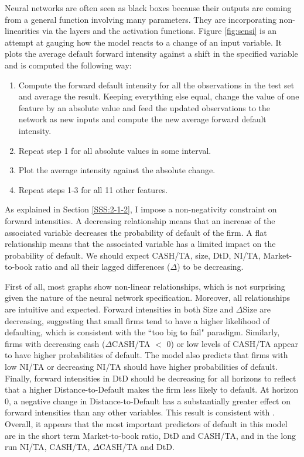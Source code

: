 Neural networks are often seen as black boxes because their outputs are coming from a general function involving many parameters. They are incorporating non-linearities via the layers and the activation functions. Figure \ref{fig:sensi} is an attempt at gauging how the model reacts to a change of an input variable. It plots the average default forward intensity against a shift in the specified variable and is computed the following way:

\begin{enumerate}
    \item Compute the forward default intensity for all the observations in the test set and average the result. Keeping everything else equal, change the value of one feature by an absolute value and feed the updated observations to the network as new inputs and compute the new average forward default intensity. 
    \item Repeat step 1 for all absolute values in some interval.
    \item Plot the average intensity against the absolute change.
    \item Repeat steps 1-3 for all 11 other features.
\end{enumerate}

As explained in Section \ref{SSS:2-1-2}, I impose a non-negativity constraint on forward intensities. A decreasing relationship means that an increase of the associated variable decreases the probability of default of the firm. A flat relationship means that the associated variable has a limited impact on the probability of default. We should expect CASH/TA, size, DtD, NI/TA, Market-to-book ratio and all their lagged differences ($\Delta$) to be decreasing.

First of all, most graphs show non-linear relationships, which is not surprising given the nature of the neural network specification. Moreover, all relationships are intuitive and expected. Forward intensities in both Size and $\Delta$Size are decreasing, suggesting that small firms tend to have a higher likelihood of defaulting, which is consistent with the ``too big to fail" paradigm. Similarly, firms with decreasing cash ($\Delta$CASH/TA $<$ 0) or low levels of CASH/TA appear to have higher probabilities of default. The model also predicts that firms with low NI/TA or decreasing NI/TA should have higher probabilities of default. Finally, forward intensities in DtD should be decreasing for all horizons to reflect that a higher Distance-to-Default makes the firm less likely to default. At horizon 0, a negative change in Distance-to-Default has a substantially greater effect on forward intensities than any other variables. This result is consistent with \cite{DSW}. Overall,
it appears that the most important predictors of default in this model are in the short term Market-to-book ratio, DtD and CASH/TA, and in the long run NI/TA, CASH/TA, $\Delta$CASH/TA and DtD.


